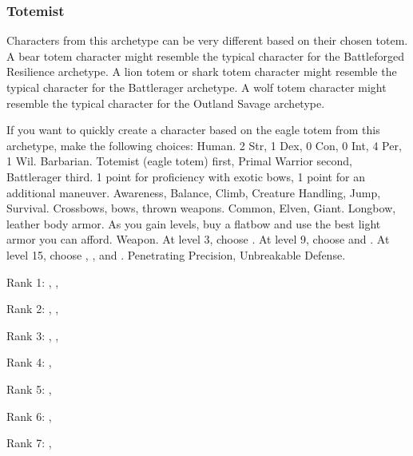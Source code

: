         \subsubsection{Totemist}
            Characters from this archetype can be very different based on their chosen totem.
            A bear totem character might resemble the typical character for the Battleforged Resilience archetype.
            A lion totem or shark totem character might resemble the typical character for the Battlerager archetype.
            A wolf totem character might resemble the typical character for the Outland Savage archetype.

            If you want to quickly create a character based on the eagle totem from this archetype, make the following choices:
             Human.
             2 Str, 1 Dex, 0 Con, 0 Int, 4 Per, 1 Wil.
             Barbarian.
             Totemist (eagle totem) first, Primal Warrior second, Battlerager third.
             1 point for proficiency with exotic bows, 1 point for an additional maneuver.
             Awareness, Balance, Climb, Creature Handling, Jump, Survival.
             Crossbows, bows, thrown weapons.
             Common, Elven, Giant.
             Longbow, leather body armor. As you gain levels, buy a flatbow and use the best light armor you can afford.
             Weapon.
                At level 3, choose .
                At level 9, choose  and .
                At level 15, choose , , and .
             Penetrating Precision, Unbreakable Defense.
            \begin{raggeditemize}
                \item Rank 1: , , 
                \item Rank 2: , , 
                \item Rank 3: , , 
                \item Rank 4: , 
                \item Rank 5: , 
                \item Rank 6: , 
                \item Rank 7: , 
            \end{raggeditemize}
